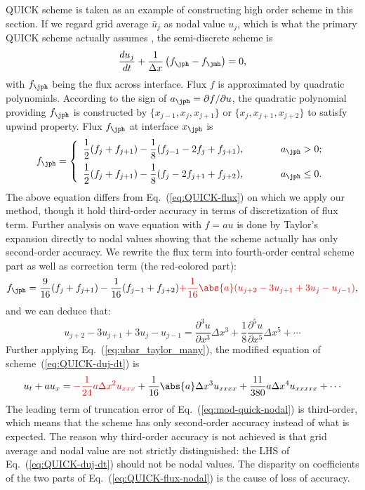 \documentclass[]{article}
\begin{document}
QUICK scheme is taken as an example of constructing high order scheme in this
section.  
If we regard grid average $\bar u_j$ as nodal value $u_j$, which is what the primary QUICK
scheme actually assumes \cite{leonard1979stable}, the semi-discrete scheme is
\begin{equation}
  \frac{d u_j}{d t}+\frac{1}{\Delta x}\left(f_{\jph}-f_{\jmh}\right)=0,
  \label{eq:QUICK-duj-dt}
\end{equation}
with $f_\jph$ being the flux across interface. Flux $f$ is approximated by
quadratic polynomials. According to the sign of $a_\jph = \partial f/\partial
u$, the quadratic polynomial providing $f_\jph$ is constructed by $\{ x_{j-1}, x_j,
x_{j+1}
\}$ or $\{ x_j, x_{j+1}, x_{j+2} \}$ to satisfy upwind
property. Flux $f_\jph$ at interface $x_\jph$ is
\begin{equation*}
  f_{\jph}=\left\{\begin{array}{ll}
  \displaystyle
  \frac{1}{2}(f_j+f_{j+1})-\frac{1}{8}(f_{j-1}-2f_j+f_{j+1}),\hspace{1cm} & a_{\jph}>0;\\[3mm]
  \displaystyle
  \frac{1}{2}(f_j+f_{j+1})-\frac{1}{8}(f_j-2f_{j+1}+f_{j+2}),\hspace{1cm}
  & a_{\jph}\leq 0.\\
  \end{array}\right.
\end{equation*}
The above equation differs from Eq.~(\ref{eq:QUICK-flux}) on which we apply our
method, though it hold
third-order accuracy in terms of discretization of flux term. Further analysis on wave
equation with $f=au$ is done
by Taylor's expansion directly to nodal values showing that the scheme
actually has only second-order accuracy. We rewrite the flux term into
fourth-order central scheme part as well as correction term (the red-colored part):
\begin{equation}
  f_{\jph}=\frac{9}{16}(f_j+f_{j+1})-\frac{1}{16}(f_{j-1}+f_{j+2}){\color{red}+\frac{1}{16}\abs{a}(u_{j+2}-3u_{j+1}+3u_{j}-u_{j-1})},
  \label{eq:QUICK-flux-nodal}
\end{equation}
and we can deduce that:
\[
u_{j+2}-3u_{j+1}+3u_{j}-u_{j-1}=\frac{\partial^3 u}{\partial x^3}\Delta x^3+\frac{1}{8}\frac{\partial^5 u}{\partial x^5}\Delta x^5+\cdots
\]
Further applying Eq.~(\ref{eq:ubar_taylor_many}), the modified equation of
scheme~(\ref{eq:QUICK-duj-dt}) is 
\begin{equation}
  u_t+au_x={\color{red}-\frac{1}{24}a\Delta x^2 u_{xxx}}+\frac{1}{16}\abs{a}\Delta x^3 u_{xxxx}+\frac{11}{380}a\Delta x^4 u_{xxxxx} +\cdots
  \label{eq:mod-quick-nodal}
\end{equation}
The leading term of truncation error of Eq.~(\ref{eq:mod-quick-nodal}) is
third-order, which means that the scheme has only second-order accuracy instead
of what is expected. The reason why third-order accuracy is not achieved is that
grid average and nodal value are not strictly distinguished: the LHS of
Eq.~(\ref{eq:QUICK-duj-dt}) should not be nodal values. The disparity on
coefficients of the two parts of Eq.~(\ref{eq:QUICK-flux-nodal}) is the cause of loss of
accuracy.
\end{document}
